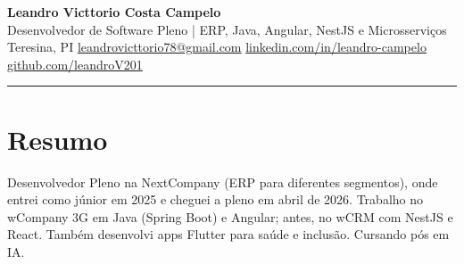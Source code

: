 \begin{center}
  {\LARGE\bfseries Leandro Victtorio Costa Campelo}\\[4pt]
  {\small Desenvolvedor de Software Pleno | ERP, Java, Angular, NestJS e Microsserviços}\\[2pt]
  {\small Teresina, PI {\textbullet} \href{mailto:leandrovicttorio78@gmail.com}{leandrovicttorio78@gmail.com} {\textbullet} \href{https://www.linkedin.com/in/leandro-campelo/}{linkedin.com/in/leandro-campelo} {\textbullet} \href{https://github.com/leandroV201}{github.com/leandroV201}}
\end{center}
\vspace{-0.9em}
\noindent\rule{\linewidth}{0.3pt}

\section{Resumo}
Desenvolvedor Pleno na NextCompany (ERP para diferentes segmentos), onde entrei como júnior em 2025 e cheguei a pleno em abril de 2026. Trabalho no wCompany 3G em Java (Spring Boot) e Angular; antes, no wCRM com NestJS e React. Também desenvolvi apps Flutter para saúde e inclusão. Cursando pós em IA.
